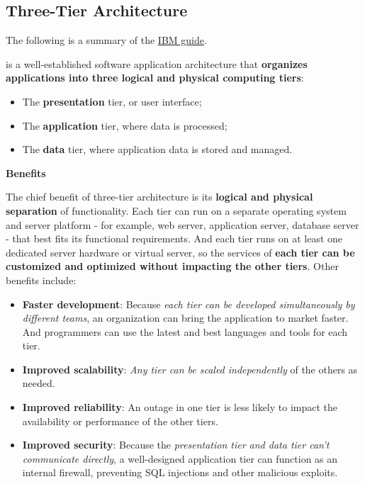 \subsection{Three-Tier Architecture}

The following is a summary of the \href{https://www.ibm.com/topics/three-tier-architecture}{IBM guide}.

\highspace
{} is a well-established software application architecture that \textbf{organizes applications into three logical and physical computing tiers}: 
\begin{itemize}
    \item The \textbf{presentation} tier, or user interface;
    
    \item The \textbf{application} tier, where data is processed;
    
    \item The \textbf{data} tier, where application data is stored and managed.
\end{itemize}

\begin{flushleft}
    \textcolor{Green3}{\textbf{ Benefits}}
\end{flushleft}
The chief benefit of three-tier architecture is its \textbf{logical and physical separation} of functionality. Each tier can run on a separate operating system and server platform - for example, web server, application server, database server - that best fits its functional requirements. And each tier runs on at least one dedicated server hardware or virtual server, so the services of \textbf{each tier can be customized and optimized without impacting the other tiers}. Other benefits include:
\begin{itemize}
    \item \textbf{Faster development}: Because \emph{each tier can be developed simultaneously by different teams}, an organization can bring the application to market faster. And programmers can use the latest and best languages and tools for each tier.
    
    \item \textbf{Improved scalability}: \emph{Any tier can be scaled independently} of the others as needed.

    \item \textbf{Improved reliability}: An outage in one tier is less likely to impact the availability or performance of the other tiers.

    \item \textbf{Improved security}: Because the \emph{presentation tier and data tier can't communicate directly}, a well-designed application tier can function as an internal firewall, preventing SQL injections and other malicious exploits.
\end{itemize}

